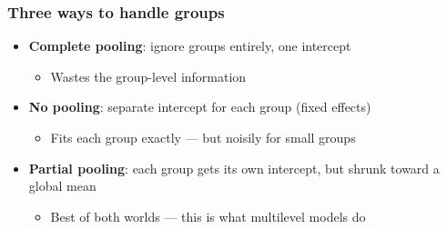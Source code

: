 \begin{frame}
\frametitle{Three ways to handle groups}
\centering

\begin{itemize}
\item \textbf{Complete pooling}: ignore groups entirely, one intercept
  \begin{itemize}
  \item Wastes the group-level information
  \end{itemize}
\vspace{6pt}
\item \textbf{No pooling}: separate intercept for each group (fixed effects)
  \begin{itemize}
  \item Fits each group exactly --- but noisily for small groups
  \end{itemize}
\vspace{6pt}
\item \textbf{Partial pooling}: each group gets its own intercept, but shrunk toward a global mean
  \begin{itemize}
  \item Best of both worlds --- this is what multilevel models do
  \end{itemize}
\end{itemize}

\end{frame}

